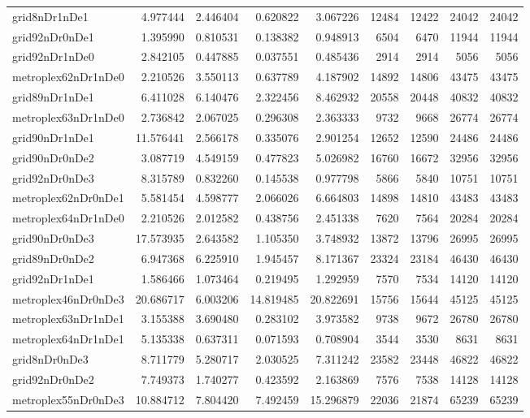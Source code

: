 \begin{longtable}{|l|r|r|r|r|r|r|r|r|}
grid8nDr1nDe1 & 4.977444 & 2.446404 & 0.620822 & 3.067226 & 12484 & 12422 & 24042 & 24042 \\
grid92nDr0nDe1 & 1.395990 & 0.810531 & 0.138382 & 0.948913 & 6504 & 6470 & 11944 & 11944 \\
grid92nDr1nDe0 & 2.842105 & 0.447885 & 0.037551 & 0.485436 & 2914 & 2914 & 5056 & 5056 \\
metroplex62nDr1nDe0 & 2.210526 & 3.550113 & 0.637789 & 4.187902 & 14892 & 14806 & 43475 & 43475 \\
grid89nDr1nDe1 & 6.411028 & 6.140476 & 2.322456 & 8.462932 & 20558 & 20448 & 40832 & 40832 \\
metroplex63nDr1nDe0 & 2.736842 & 2.067025 & 0.296308 & 2.363333 & 9732 & 9668 & 26774 & 26774 \\
grid90nDr1nDe1 & 11.576441 & 2.566178 & 0.335076 & 2.901254 & 12652 & 12590 & 24486 & 24486 \\
grid90nDr0nDe2 & 3.087719 & 4.549159 & 0.477823 & 5.026982 & 16760 & 16672 & 32956 & 32956 \\
grid92nDr0nDe3 & 8.315789 & 0.832260 & 0.145538 & 0.977798 & 5866 & 5840 & 10751 & 10751 \\
metroplex62nDr0nDe1 & 5.581454 & 4.598777 & 2.066026 & 6.664803 & 14898 & 14810 & 43483 & 43483 \\
metroplex64nDr1nDe0 & 2.210526 & 2.012582 & 0.438756 & 2.451338 & 7620 & 7564 & 20284 & 20284 \\
grid90nDr0nDe3 & 17.573935 & 2.643582 & 1.105350 & 3.748932 & 13872 & 13796 & 26995 & 26995 \\
grid89nDr0nDe2 & 6.947368 & 6.225910 & 1.945457 & 8.171367 & 23324 & 23184 & 46430 & 46430 \\
grid92nDr1nDe1 & 1.586466 & 1.073464 & 0.219495 & 1.292959 & 7570 & 7534 & 14120 & 14120 \\
metroplex46nDr0nDe3 & 20.686717 & 6.003206 & 14.819485 & 20.822691 & 15756 & 15644 & 45125 & 45125 \\
metroplex63nDr1nDe1 & 3.155388 & 3.690480 & 0.283102 & 3.973582 & 9738 & 9672 & 26780 & 26780 \\
metroplex64nDr1nDe1 & 5.135338 & 0.637311 & 0.071593 & 0.708904 & 3544 & 3530 & 8631 & 8631 \\
grid8nDr0nDe3 & 8.711779 & 5.280717 & 2.030525 & 7.311242 & 23582 & 23448 & 46822 & 46822 \\
grid92nDr0nDe2 & 7.749373 & 1.740277 & 0.423592 & 2.163869 & 7576 & 7538 & 14128 & 14128 \\
metroplex55nDr0nDe3 & 10.884712 & 7.804420 & 7.492459 & 15.296879 & 22036 & 21874 & 65239 & 65239 \\

\end{longtable}
